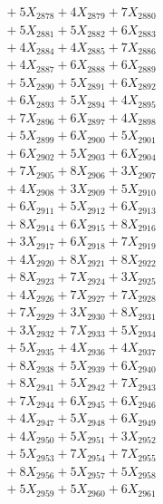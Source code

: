 \documentclass[a4paper,10pt]{article}
\begin{document}
{\begin{align}
&\;  + 5 X_{2878} + 4 X_{2879} + 7 X_{2880} \\[0.3ex]
&\;  + 5 X_{2881} + 5 X_{2882} + 6 X_{2883} \\[0.3ex]
&\;  + 4 X_{2884} + 4 X_{2885} + 7 X_{2886} \\[0.3ex]
&\;  + 4 X_{2887} + 6 X_{2888} + 6 X_{2889} \\[0.5ex]\allowbreak
&\;  + 5 X_{2890} + 5 X_{2891} + 6 X_{2892} \\[0.3ex]
&\;  + 6 X_{2893} + 5 X_{2894} + 4 X_{2895} \\[0.3ex]
&\;  + 7 X_{2896} + 6 X_{2897} + 4 X_{2898} \\[0.3ex]
&\;  + 5 X_{2899} + 6 X_{2900} + 5 X_{2901} \\[0.3ex]
&\;  + 6 X_{2902} + 5 X_{2903} + 6 X_{2904} \\[0.3ex]
&\;  + 7 X_{2905} + 8 X_{2906} + 3 X_{2907} \\[0.3ex]
&\;  + 4 X_{2908} + 3 X_{2909} + 5 X_{2910} \\[0.3ex]
&\;  + 6 X_{2911} + 5 X_{2912} + 6 X_{2913} \\[0.3ex]
&\;  + 8 X_{2914} + 6 X_{2915} + 8 X_{2916} \\[0.3ex]
&\;  + 3 X_{2917} + 6 X_{2918} + 7 X_{2919} \\[0.5ex]\allowbreak
&\;  + 4 X_{2920} + 8 X_{2921} + 8 X_{2922} \\[0.3ex]
&\;  + 8 X_{2923} + 7 X_{2924} + 3 X_{2925} \\[0.3ex]
&\;  + 4 X_{2926} + 7 X_{2927} + 7 X_{2928} \\[0.3ex]
&\;  + 7 X_{2929} + 3 X_{2930} + 8 X_{2931} \\[0.3ex]
&\;  + 3 X_{2932} + 7 X_{2933} + 5 X_{2934} \\[0.3ex]
&\;  + 5 X_{2935} + 4 X_{2936} + 4 X_{2937} \\[0.3ex]
&\;  + 8 X_{2938} + 5 X_{2939} + 6 X_{2940} \\[0.3ex]
&\;  + 8 X_{2941} + 5 X_{2942} + 7 X_{2943} \\[0.3ex]
&\;  + 7 X_{2944} + 6 X_{2945} + 6 X_{2946} \\[0.3ex]
&\;  + 4 X_{2947} + 5 X_{2948} + 6 X_{2949} \\[0.5ex]\allowbreak
&\;  + 4 X_{2950} + 5 X_{2951} + 3 X_{2952} \\[0.3ex]
&\;  + 5 X_{2953} + 7 X_{2954} + 7 X_{2955} \\[0.3ex]
&\;  + 8 X_{2956} + 5 X_{2957} + 5 X_{2958} \\[0.3ex]
&\;  + 5 X_{2959} + 5 X_{2960} + 6 X_{2961} \\[0.3ex]

\end{align}}
\end{document}
